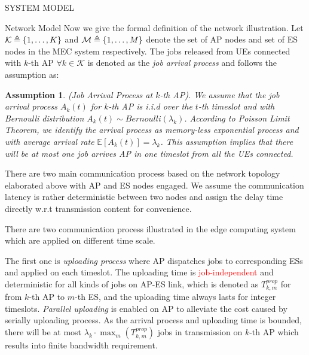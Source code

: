 \documentclass[10pt, conference, letterpaper]{IEEEtran}
\newtheorem{assumption}{Assumption}
\DeclarePairedDelimiter{\set}{\{}{\}}
\newcommand{\apSet}{\mathcal{K}}
\begin{document}
\begin{section}{SYSTEM MODEL}
\begin{subsection}{Network Model}
            Now we give the formal definition of the network illustration. Let $\mathcal{K} \triangleq \set{1,\dots,K}$ and $\mathcal{M} \triangleq \set{1,\dots,M}$ denote the set of AP nodes and set of ES nodes in the MEC system respectively. The jobs released from UEs connected with $k$-th AP $\forall k\in\apSet$ is denoted as the \emph{job arrival process} and follows the assumption as:
            \begin{assumption}
                (Job Arrival Process at $k$-th AP).
                We assume that the job arrival process $A_k(t)$ for $k$-th AP is i.i.d over the $t$-th timeslot and with Bernoulli distribution $A_k(t) \sim Bernoulli(\lambda_k)$.  According to Poisson Limit Theorem, we identify the arrival process as memory-less exponential process and with average arrival rate $\mathbb{E}[A_k(t)] = \lambda_k$.
                This assumption implies that there will be at most one job arrives AP in one timeslot from all the UEs connected.
            \end{assumption}

            There are two main communication process based on the network topology elaborated above with AP and ES nodes engaged. 
            We assume the communication latency is rather deterministic between two nodes and assign the delay time directly w.r.t transmission content for convenience.

            There are two communication process illustrated in the edge computing system which are applied on different time scale.
            
            The first one is \emph{uploading process} where AP dispatches jobs to corresponding ESs and applied on each timeslot. The uploading time is \textcolor{red}{job-independent} and deterministic for all kinds of jobs on AP-ES link, which is denoted as $T^{prop}_{k,m}$ for from $k$-th AP to $m$-th ES, and the uploading time always lasts for integer timeslots. \emph{Parallel uploading} is enabled on AP to alleviate the cost caused by serially uploading process. As the arrival process and uploading time is bounded, there will be at most $\lambda_k \cdot \max_m(T^{prop}_{k,m})$ jobs in transmission on $k$-th AP which results into finite bandwidth requirement.
            

\end{subsection}
\end{section}
\end{document}
